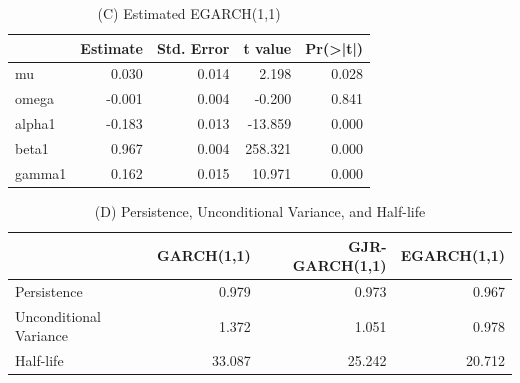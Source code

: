 \documentclass[]{book}
\theoremstyle{definition}
\theoremstyle{definition}
\theoremstyle{definition}
\theoremstyle{remark}
\begin{document}
\begin{table}[t]

\caption{\label{tab:unnamed-chunk-14}(C) Estimated EGARCH(1,1)}
\centering
\begin{tabular}{l|r|r|r|r}
\hline
  &  Estimate &  Std. Error &  t value & Pr(>|t|)\\
\hline
mu & 0.030 & 0.014 & 2.198 & 0.028\\
\hline
omega & -0.001 & 0.004 & -0.200 & 0.841\\
\hline
alpha1 & -0.183 & 0.013 & -13.859 & 0.000\\
\hline
beta1 & 0.967 & 0.004 & 258.321 & 0.000\\
\hline
gamma1 & 0.162 & 0.015 & 10.971 & 0.000\\
\hline
\end{tabular}
\end{table}

\begin{table}[t]

\caption{\label{tab:unnamed-chunk-14}(D) Persistence, Unconditional Variance, and Half-life}
\centering
\begin{tabular}{l|r|r|r}
\hline
  & GARCH(1,1) & GJR-GARCH(1,1) & EGARCH(1,1)\\
\hline
Persistence & 0.979 & 0.973 & 0.967\\
\hline
Unconditional Variance & 1.372 & 1.051 & 0.978\\
\hline
Half-life & 33.087 & 25.242 & 20.712\\
\hline
\end{tabular}
\end{table}
\end{document}
